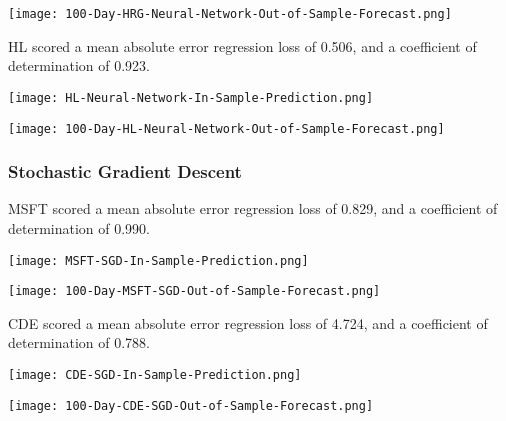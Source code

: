 \begin{center}  
    \texttt{[image: 100-Day-HRG-Neural-Network-Out-of-Sample-Forecast.png]}
    \label{fig:nonfloat}
\end{center}

HL scored a mean absolute error regression loss of 0.506, and a coefficient of determination of 0.923.

\begin{center}
    \texttt{[image: HL-Neural-Network-In-Sample-Prediction.png]}
    \label{fig:nonfloat}
\end{center}

\begin{center}  
    \texttt{[image: 100-Day-HL-Neural-Network-Out-of-Sample-Forecast.png]}
    \label{fig:nonfloat}
\end{center}

\subsubsection{Stochastic Gradient Descent}
MSFT scored a mean absolute error regression loss of 0.829, and a coefficient of determination of 0.990.

\begin{center}
    \texttt{[image: MSFT-SGD-In-Sample-Prediction.png]}
    \label{fig:nonfloat}
\end{center}

\begin{center}  
    \texttt{[image: 100-Day-MSFT-SGD-Out-of-Sample-Forecast.png]}
    \label{fig:nonfloat}
\end{center}

CDE scored a mean absolute error regression loss of 4.724, and a coefficient of determination of 0.788.

\begin{center}
    \texttt{[image: CDE-SGD-In-Sample-Prediction.png]}
    \label{fig:nonfloat}
\end{center}

\begin{center}  
    \texttt{[image: 100-Day-CDE-SGD-Out-of-Sample-Forecast.png]}
    \label{fig:nonfloat}
\end{center}


